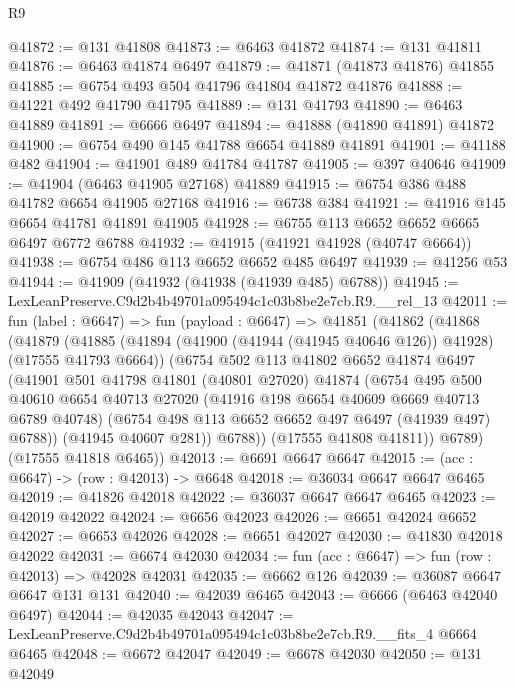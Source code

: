 \begin{lexlean}{R9}
\begin{coremodule}
@41872 := @131 @41808
@41873 := @6463 @41872
@41874 := @131 @41811
@41876 := @6463 @41874 @6497
@41879 := @41871 (@41873 @41876) @41855
@41885 := @6754 @493 @504 @41796 @41804 @41872 @41876
@41888 := @41221 @492 @41790 @41795
@41889 := @131 @41793
@41890 := @6463 @41889
@41891 := @6666 @6497
@41894 := @41888 (@41890 @41891) @41872
@41900 := @6754 @490 @145 @41788 @6654 @41889 @41891
@41901 := @41188 @482
@41904 := @41901 @489 @41784 @41787
@41905 := @397 @40646
@41909 := @41904 (@6463 @41905 @27168) @41889
@41915 := @6754 @386 @488 @41782 @6654 @41905 @27168
@41916 := @6738 @384
@41921 := @41916 @145 @6654 @41781 @41891 @41905
@41928 := @6755 @113 @6652 @6652 @6665 @6497 @6772 @6788
@41932 := @41915 (@41921 @41928 (@40747 @6664))
@41938 := @6754 @486 @113 @6652 @6652 @485 @6497
@41939 := @41256 @53
@41944 := @41909 (@41932 (@41938 (@41939 @485) @6788))
@41945 := LexLeanPreserve.C9d2b4b49701a095494c1c03b8be2e7cb.R9.__rel_13
@42011 := fun (label : @6647) =>
  fun (payload : @6647) =>
  @41851
    (@41862
      (@41868
        (@41879
          (@41885
            (@41894 (@41900 (@41944 (@41945 @40646 @126)) @41928) (@17555 @41793 @6664))
            (@6754
              @502
              @113
              @41802
              @6652
              @41874
              @6497
              (@41901
                @501
                @41798
                @41801
                (@40801 @27020)
                @41874
                (@6754
                  @495
                  @500
                  @40610
                  @6654
                  @40713
                  @27020
                  (@41916 @198 @6654 @40609 @6669 @40713 @6789 @40748)
                  (@6754 @498 @113 @6652 @6652 @497 @6497 (@41939 @497) @6788))
                (@41945 @40607 @281))
              @6788))
          (@17555 @41808 @41811))
        @6789)
      (@17555 @41818 @6465))
@42013 := @6691 @6647 @6647
@42015 := (acc : @6647) -> (row : @42013) -> @6648
@42018 := @36034 @6647 @6647 @6465
@42019 := @41826 @42018
@42022 := @36037 @6647 @6647 @6465
@42023 := @42019 @42022
@42024 := @6656 @42023
@42026 := @6651 @42024 @6652
@42027 := @6653 @42026
@42028 := @6651 @42027
@42030 := @41830 @42018 @42022
@42031 := @6674 @42030
@42034 := fun (acc : @6647) => fun (row : @42013) => @42028 @42031
@42035 := @6662 @126
@42039 := @36087 @6647 @6647 @131 @131
@42040 := @42039 @6465
@42043 := @6666 (@6463 @42040 @6497)
@42044 := @42035 @42043
@42047 := LexLeanPreserve.C9d2b4b49701a095494c1c03b8be2e7cb.R9.__fits_4 @6664 @6465
@42048 := @6672 @42047
@42049 := @6678 @42030
@42050 := @131 @42049

\end{coremodule}
\end{lexlean}

